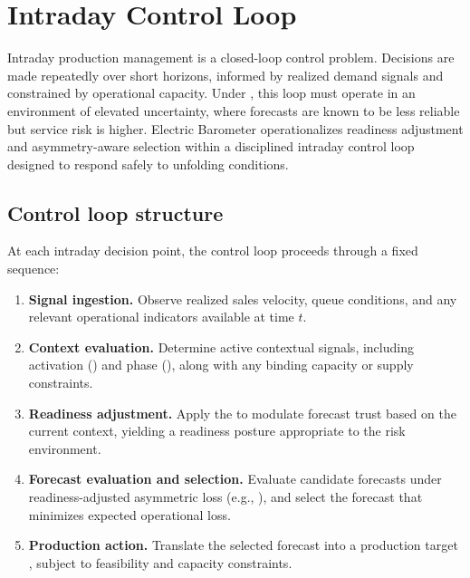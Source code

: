 
\section{Intraday Control Loop}
\label{sec:intraday-loop}

Intraday production management is a closed-loop control problem. Decisions are made repeatedly
over short horizons, informed by realized demand signals and constrained by operational capacity.
Under \LTOs{}, this loop must operate in an environment of elevated uncertainty, where forecasts are
known to be less reliable but service risk is higher. Electric Barometer operationalizes readiness
adjustment and asymmetry-aware selection within a disciplined intraday control loop designed to
respond safely to unfolding conditions.

\subsection{Control loop structure}
\label{subsec:control-structure}

At each intraday decision point, the control loop proceeds through a fixed sequence:
\begin{enumerate}[leftmargin=*, itemsep=2pt]
  \item \textbf{Signal ingestion.} Observe realized sales velocity, queue conditions, and any
  relevant operational indicators available at time $t$.
  \item \textbf{Context evaluation.} Determine active contextual signals, including \LTO{}
  activation (\ltoOn{}) and phase (\ltoPhase{}), along with any binding capacity or supply
  constraints.
  \item \textbf{Readiness adjustment.} Apply the \RAL{} to modulate forecast trust based on the
  current context, yielding a readiness posture appropriate to the risk environment.
  \item \textbf{Forecast evaluation and selection.} Evaluate candidate forecasts under
  readiness-adjusted asymmetric loss (e.g., \CWSL{}), and select the forecast that minimizes
  expected operational loss.
  \item \textbf{Production action.} Translate the selected forecast into a production target
  \qprod{}, subject to feasibility and capacity constraints.
\end{enumerate}

